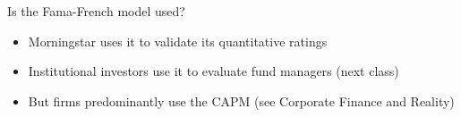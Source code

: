 \documentclass[10pt]{beamer}
\begin{document}
\begin{frame}{Is the Fama-French model used?}
\begin{itemize}
\item Morningstar uses it to validate its quantitative ratings
\item Institutional investors use it to evaluate fund managers (next class)
\item But firms predominantly use the CAPM (see Corporate Finance and Reality)
\end{itemize}
\end{frame}
\end{document}
